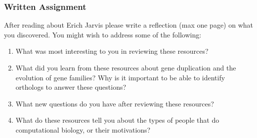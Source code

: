 \documentclass{article}
\begin{document}
\subsubsection*{Written Assignment} 
After reading about Erich Jarvis please write a reflection (max one page) on what you discovered. You might wish to address some of the following: 

\begin{enumerate}
\item What was most interesting to you in reviewing these resources?
\item What did you learn from these resources about gene duplication and the evolution of gene families? Why is it important to be able to identify orthologs to answer these questions?
\item What new questions do you have after reviewing these resources?
\item What do these resources tell you about the types of people that do computational biology, or their motivations?
\end{enumerate}

\EndAccSupp{}
\end{document}
